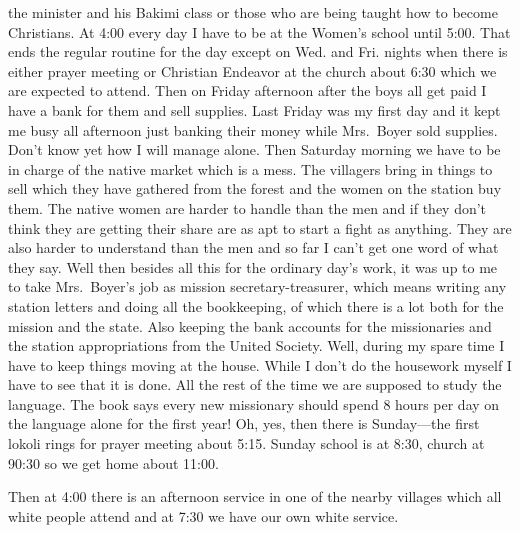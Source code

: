 \documentclass[
]{book}
\begin{document}
the minister and his Bakimi class or those who are being taught how to become Christians. At 4:00 every day I have to be at the Women's school until 5:00. That ends the regular routine for the day except on Wed. and Fri. nights when there is either prayer meeting or Christian Endeavor at the church about 6:30 which we are expected to attend. Then on Friday afternoon after the boys all get paid I have a bank for them and sell supplies. Last Friday was my first day and it kept me busy all afternoon just banking their money while Mrs.~Boyer sold supplies. Don't know yet how I will manage alone. Then Saturday morning we have to be in charge of the native market which is a mess. The villagers bring in things to sell which they have gathered from the forest and the women on the station buy them. The native women are harder to handle than the men and if they don't think they are getting their share are as apt to start a fight as anything. They are also harder to understand than the men and so far I can't get one word of what they say. Well then besides all this for the ordinary day's work, it was up to me to take Mrs.~Boyer's job as mission secretary-treasurer, which means writing any station letters and doing all the bookkeeping, of which there is a lot both for the mission and the state. Also keeping the bank accounts for the missionaries and the station appropriations from the United Society. Well, during my spare time I have to keep things moving at the house. While I don't do the housework myself I have to see that it is done. All the rest of the time we are supposed to study the language. The book says every new missionary should spend 8 hours per day on the language alone for the first year! Oh, yes, then there is Sunday---the first lokoli rings for prayer meeting about 5:15. Sunday school is at 8:30, church at 90:30 so we get home about 11:00.

Then at 4:00 there is an afternoon service in one of the nearby villages which all white people attend and at 7:30 we have our own white service.
\end{document}
